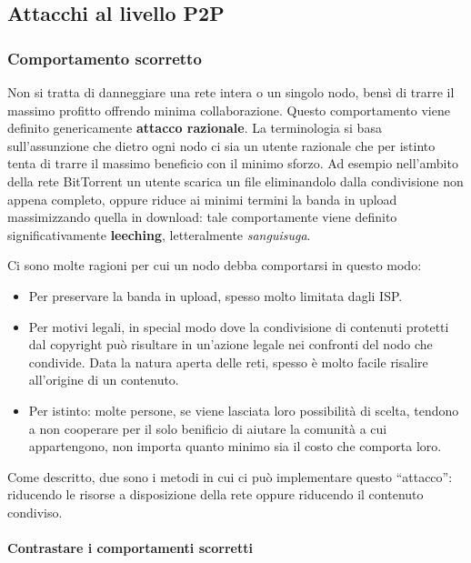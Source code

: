 \subsection{Attacchi al livello P2P}\label{attacchi-al-livello-p2p}

\subsubsection{Comportamento scorretto}\label{comportamento-scorretto}
 Non si tratta di danneggiare una rete intera o un singolo nodo, bensì di trarre il massimo profitto offrendo minima collaborazione. Questo comportamento viene definito genericamente \textbf{attacco razionale}. La terminologia si basa sull'assunzione che dietro ogni nodo ci sia un utente razionale che per istinto tenta di trarre il massimo beneficio con il minimo sforzo. Ad esempio nell'ambito della rete BitTorrent un utente scarica un file eliminandolo dalla condivisione non appena completo, oppure riduce ai minimi termini la banda in upload massimizzando quella in download: tale comportamente viene definito significativamente \textbf{leeching}, letteralmente \emph{sanguisuga}.

Ci sono molte ragioni per cui un nodo debba comportarsi in questo modo:

\begin{itemize}
\itemsep1pt\parskip0pt
\item
  Per preservare la banda in upload, spesso molto limitata dagli ISP.
\item
  Per motivi legali, in special modo dove la condivisione di contenuti   protetti dal copyright può risultare in un'azione legale nei confronti   del nodo che condivide. Data la natura aperta delle reti, spesso è   molto facile risalire all'origine di un contenuto.
\item
  Per istinto: molte persone, se viene lasciata loro possibilità di   scelta, tendono a non cooperare per il solo benificio di aiutare la   comunità a cui appartengono, non importa quanto minimo sia il costo   che comporta loro.
\end{itemize}

Come descritto, due sono i metodi in cui ci può implementare questo ``attacco'': riducendo le risorse a disposizione della rete oppure riducendo il contenuto condiviso.

\paragraph{Contrastare i comportamenti scorretti}\label{contrastare-i-comportamenti-scorretti}


